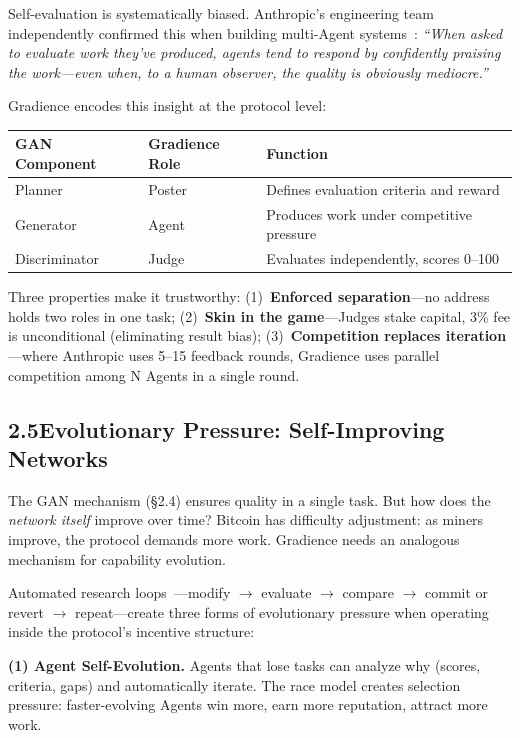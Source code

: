 \documentclass[11pt,a4paper]{article}
\begin{document}
Self-evaluation is systematically biased. Anthropic's engineering team independently confirmed this when building multi-Agent systems~\cite{anthropic}: \emph{``When asked to evaluate work they've produced, agents tend to respond by confidently praising the work---even when, to a human observer, the quality is obviously mediocre.''}

Gradience encodes this insight at the protocol level:

\begin{table}[H]\centering\small
\begin{tabular}{@{}lll@{}}
\toprule
\textbf{GAN Component} & \textbf{Gradience Role} & \textbf{Function} \\
\midrule
Planner & Poster & Defines evaluation criteria and reward \\
Generator & Agent & Produces work under competitive pressure \\
Discriminator & Judge & Evaluates independently, scores 0--100 \\
\bottomrule
\end{tabular}
\end{table}

Three properties make it trustworthy: (1)~\textbf{Enforced separation}---no address holds two roles in one task; (2)~\textbf{Skin in the game}---Judges stake capital, 3\% fee is unconditional (eliminating result bias); (3)~\textbf{Competition replaces iteration}---where Anthropic uses 5--15 feedback rounds, Gradience uses parallel competition among N Agents in a single round.

\subsection{2.5\quad Evolutionary Pressure: Self-Improving Networks}

The GAN mechanism (\S2.4) ensures quality in a single task. But how does the \emph{network itself} improve over time? Bitcoin has difficulty adjustment: as miners improve, the protocol demands more work. Gradience needs an analogous mechanism for capability evolution.

Automated research loops~\cite{karpathy}---modify $\to$ evaluate $\to$ compare $\to$ commit or revert $\to$ repeat---create three forms of evolutionary pressure when operating inside the protocol's incentive structure:

\textbf{(1) Agent Self-Evolution.} Agents that lose tasks can analyze why (scores, criteria, gaps) and automatically iterate. The race model creates selection pressure: faster-evolving Agents win more, earn more reputation, attract more work.
\end{document}
